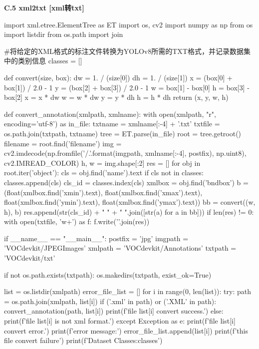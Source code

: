 \documentclass{MathorCupmodeling}
\begin{document}
\textbf{C.5 xml2txt [xml转txt]}
\begin{python}
import xml.etree.ElementTree as ET
import os, cv2
import numpy as np
from os import listdir
from os.path import join

#将给定的XML格式的标注文件转换为YOLOv8所需的TXT格式，并记录数据集中的类别信息
classes = []

def convert(size, box):
    dw = 1. / (size[0])
    dh = 1. / (size[1])
    x = (box[0] + box[1]) / 2.0 - 1
    y = (box[2] + box[3]) / 2.0 - 1
    w = box[1] - box[0]
    h = box[3] - box[2]
    x = x * dw
    w = w * dw
    y = y * dh
    h = h * dh
    return (x, y, w, h)


def convert_annotation(xmlpath, xmlname):
    with open(xmlpath, "r", encoding='utf-8') as in_file:
        txtname = xmlname[:-4] + '.txt'
        txtfile = os.path.join(txtpath, txtname)
        tree = ET.parse(in_file)
        root = tree.getroot()
        filename = root.find('filename')
        img = cv2.imdecode(np.fromfile('{}/{}.{}'.format(imgpath, xmlname[:-4], postfix), np.uint8), cv2.IMREAD_COLOR)
        h, w = img.shape[:2]
        res = []
        for obj in root.iter('object'):
            cls = obj.find('name').text
            if cls not in classes:
                classes.append(cls)
            cls_id = classes.index(cls)
            xmlbox = obj.find('bndbox')
            b = (float(xmlbox.find('xmin').text), float(xmlbox.find('xmax').text), float(xmlbox.find('ymin').text),
                 float(xmlbox.find('ymax').text))
            bb = convert((w, h), b)
            res.append(str(cls_id) + " " + " ".join([str(a) for a in bb]))
        if len(res) != 0:
            with open(txtfile, 'w+') as f:
                f.write('\n'.join(res))


if __name__ == "__main__":
    postfix = 'jpg'
    imgpath = 'VOCdevkit/JPEGImages'
    xmlpath = 'VOCdevkit/Annotations'
    txtpath = 'VOCdevkit/txt'
    
    if not os.path.exists(txtpath):
        os.makedirs(txtpath, exist_ok=True)
    
    list = os.listdir(xmlpath)
    error_file_list = []
    for i in range(0, len(list)):
        try:
            path = os.path.join(xmlpath, list[i])
            if ('.xml' in path) or ('.XML' in path):
                convert_annotation(path, list[i])
                print(f'file {list[i]} convert success.')
            else:
                print(f'file {list[i]} is not xml format.')
        except Exception as e:
            print(f'file {list[i]} convert error.')
            print(f'error message:')
            error_file_list.append(list[i])
    print(f'this file convert failure')
    print(f'Dataset Classes:{classes}')
\end{python}
\end{document}
